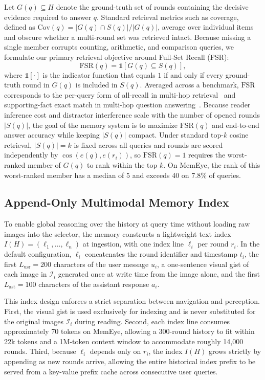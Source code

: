 \documentclass[10pt]{article}
\begin{document}
Let $G(q) \subseteq H$ denote the ground-truth set of rounds containing the decisive evidence required to answer $q$. Standard retrieval metrics such as coverage, defined as $\mathrm{Cov}(q) = |G(q) \cap S(q)| / |G(q)|$, average over individual items and obscure whether a multi-round set was retrieved intact. Because missing a single member corrupts counting, arithmetic, and comparison queries, we formulate our primary retrieval objective around Full-Set Recall (FSR):
\begin{equation}
\mathrm{FSR}(q) = \mathbb{1}\left[G(q) \subseteq S(q)\right],
\label{eq:fsr}
\end{equation}
where $\mathbb{1}[\cdot]$ is the indicator function that equals $1$ if and only if every ground-truth round in $G(q)$ is included in $S(q)$. Averaged across a benchmark, $\mathrm{FSR}$ corresponds to the per-query form of all-recall in multi-hop retrieval~\citep{gutierrez2024hipporag} and supporting-fact exact match in multi-hop question answering~\citep{yang2018hotpotqa}. Because reader inference cost and distractor interference scale with the number of opened rounds $|S(q)|$, the goal of the memory system is to maximize $\mathrm{FSR}(q)$ and end-to-end answer accuracy while keeping $|S(q)|$ compact. Under standard top-$k$ cosine retrieval, $|S(q)| = k$ is fixed across all queries and rounds are scored independently by $\cos(e(q), e(r_i))$, so $\mathrm{FSR}(q) = 1$ requires the worst-ranked member of $G(q)$ to rank within the top $k$. On MemEye, the rank of this worst-ranked member has a median of 5 and exceeds 40 on 7.8\% of queries.

\subsection{Append-Only Multimodal Memory Index}
\label{sec:index}

To enable global reasoning over the history at query time without loading raw images into the selector, the memory constructs a lightweight text index $I(H) = (\ell_1, \dots, \ell_n)$ at ingestion, with one index line $\ell_i$ per round $r_i$. In the default configuration, $\ell_i$ concatenates the round identifier and timestamp $t_i$, the first $L_{\mathrm{usr}}{=}200$ characters of the user message $u_i$, a one-sentence visual gist of each image in $\mathcal{I}_i$ generated once at write time from the image alone, and the first $L_{\mathrm{ast}}{=}100$ characters of the assistant response $a_i$.

This index design enforces a strict separation between navigation and perception. First, the visual gist is used exclusively for indexing and is never substituted for the original images $\mathcal{I}_i$ during reading. Second, each index line consumes approximately 70 tokens on MemEye, allowing a 300-round history to fit within 22k tokens and a 1M-token context window to accommodate roughly 14,000 rounds. Third, because $\ell_i$ depends only on $r_i$, the index $I(H)$ grows strictly by appending as new rounds arrive, allowing the entire historical index prefix to be served from a key-value prefix cache across consecutive user queries.
\end{document}
